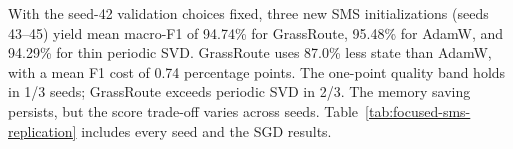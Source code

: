 With the seed-42 validation choices fixed, three new SMS initializations
(seeds 43--45) yield mean macro-F1 of 94.74\% for GrassRoute, 95.48\% for
AdamW, and 94.29\% for thin periodic SVD. GrassRoute uses 87.0\% less state
than AdamW, with a mean F1 cost of 0.74 percentage points. The one-point
quality band holds in 1/3 seeds; GrassRoute exceeds periodic SVD in 2/3.
The memory saving persists, but the score trade-off varies across seeds.
Table~\ref{tab:focused-sms-replication} includes every seed and the SGD results.\par
